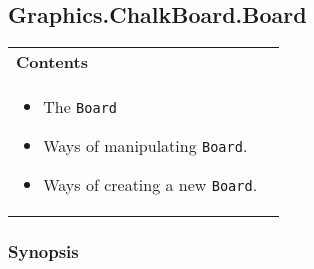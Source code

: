 \subsection{Graphics.ChalkBoard.Board}     

  

 

 
\begin{tabular}{p{0.95\linewidth}}{\bf {\bf Contents}}\\ %

 
\begin{itemize}
\setlength{\itemsep}{0in}

\item The {\tt Board} 
\item Ways of manipulating {\tt Board}.
\item Ways of creating a new {\tt Board}.
\end{itemize}
\\ %


\end{tabular}


 

 

\subsubsection{Synopsis}

 

